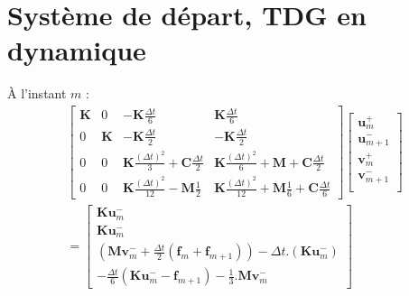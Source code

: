 \documentclass[12pt,a4paper]{report}
\begin{document}
\renewcommand{\contentsname}{Sommaire}
\tableofcontents

\section{Système de départ, TDG en dynamique}

À l'instant $m$ :
\begin{equation}
\begin{array}{c}
		\begin{bmatrix}   
		   		\mathbf{K}
			&
		   		0
		   	&
			   	-\mathbf{K} \frac{\Delta t}{6} 
		   	&
		   		\mathbf{K} \frac{\Delta t}{6} 
		\\ 	     
			   0 
			&
				\mathbf{K} 
		   	&
		   		-\mathbf{K} \frac{\Delta t}{2} 
		   	&
		   		-\mathbf{K} \frac{\Delta t}{2}
		\\   
		   		0
		   	& 
		   		0
		   	&
			   	\mathbf{K}
			   		\frac{(\Delta t)^2}{3} 
		   		+\mathbf{C} \frac{\Delta t}{2}
		   	&
		   		\mathbf{K} \frac{(\Delta t)^2}{6} 
		   		+\mathbf{M} 
			   	+\mathbf{C} \frac{\Delta t}{2}
		\\    
		   		0
		   	&
		   		0
		   	&
		   		\mathbf{K} \frac{(\Delta t)^2}{12}
		   		-\mathbf{M}
			   		\frac{1}{2} 
		   	&
		   		\mathbf{K} \frac{(\Delta t)^2}{12}
		   		+\mathbf{M} \frac{1}{6} 
			   +\mathbf{C} \frac{\Delta t}{6} 
	\end{bmatrix}
	\begin{bmatrix}
		   \mathbf{u}_m^+  		\\
		   \mathbf{u}_{m+1}^-  	\\
		   \mathbf{v}_m^+  		\\
		   \mathbf{v}_{m+1}^-  	\\
	\end{bmatrix}
	\\ =
	\begin{bmatrix}	
		  \mathbf{K} \mathbf{u}_m^-
		\\ \mathbf{K} \mathbf{u}_m^-
		\\ 	\left( \mathbf{M} \mathbf{v}_m^-
		     			+\frac{\Delta t}{2}  (\mathbf{f}_m + \mathbf{f}_{m+1})
			  \right)
			-\Delta t.
			 \left( \mathbf{K} \mathbf{u}_m^-
			  \right)
		\\-\frac{\Delta t}{6}
				\left( \mathbf{K} \mathbf{u}_m^- 
						-\mathbf{f}_{m+1}
				\right)
					  
			- \frac{1}{3} .  \mathbf{M} \mathbf{v}_m^-
	\end{bmatrix}
\end{array}
\end{equation}
\end{document}
